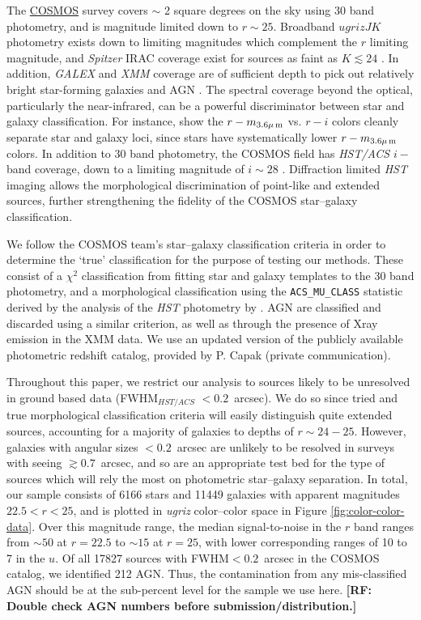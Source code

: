 \documentclass[12pt,preprint]{aastex}
\newcommand\rf[1]{{\bf [RF: #1]}}
\begin{document}
The \href{http://cosmos.astro.caltech.edu/}{COSMOS} survey 
\citep{scoville07a} covers $\sim$ 2 square degrees on
the sky using 30 band photometry, and is magnitude limited down to $r
\sim 25$.  Broadband $ugrizJK$ photometry exists down to limiting
magnitudes which complement the $r$ limiting magnitude, and {\it
  Spitzer} IRAC coverage exist for sources as faint as $K\lesssim24$ 
  \citep{capak07,sanders07,taniguchi07}.
In addition, {\it GALEX} and {\it XMM} coverage are of sufficient
depth to pick out relatively bright star-forming galaxies and AGN 
\citep{hasinger07,zamojski07}.
The spectral coverage beyond the optical, particularly the
near-infrared, can be a powerful discriminator between star and
galaxy classification.  For instance, \citet{ilbert09} show the
$r-m_{\rm 3.6\mu\,m}$ vs. $r-i$ colors cleanly separate star and
galaxy loci, since stars have systematically lower $r-m_{\rm
  3.6\mu\,m}$ colors.  In addition to 30 band photometry, the COSMOS
field has \textit{HST/ACS} $i-$band coverage, down to a limiting
magnitude of $i\sim28$ \citep{koekemoer07,scoville07b}.  Diffraction
limited \textit{HST} imaging allows the morphological discrimination
of point-like and extended sources, further strengthening the fidelity
of the COSMOS star--galaxy classification.

We follow the COSMOS team's star--galaxy classification criteria 
in order to determine the `true' classification for the purpose of 
testing our methods.  These consist of a $\chi^2$ classification 
from fitting star and galaxy templates to the 30 band photometry, 
and a morphological classification using the 
{\tt ACS\_MU\_CLASS} statistic derived by the analysis of the 
\textit{HST} photometry by \citet{scarlata07}.  AGN are classified 
and discarded using a similar criterion, as well as through the presence 
of Xray emission in the {XMM} data.  We use an updated version 
of the publicly available photometric redshift catalog, provided by 
P. Capak (private communication).  

Throughout this paper, we restrict our analysis to sources likely to
be unresolved in ground based data (FWHM$_{HST/ACS}$ $< 0.2$~arcsec).  We
do so since tried and true morphological classification criteria will
easily distinguish quite extended sources, accounting for a majority
of galaxies to depths of $r\sim24-25$.  However, galaxies with angular
sizes $< 0.2$~arcsec are unlikely to be resolved in surveys with seeing
$\gtrsim0.7$~arcsec, and so are an appropriate test bed for the type of sources
which will rely the most on photometric star--galaxy separation.  In
total, our sample consists of 6166 stars and 11449 galaxies with apparent 
magnitudes $22.5<r<25$, and is plotted in {\it ugriz} color--color space in
Figure \ref{fig:color-color-data}.   Over this magnitude range, the median 
signal-to-noise in the $r$ band ranges from $\sim50$ at $r=22.5$ to 
$\sim15$ at $r=25$, with lower corresponding ranges of 10 to 7 in the $u$.  
Of all 17827 sources with FWHM$<0.2$~arcsec in the COSMOS catalog, we 
identified 212 AGN.  Thus, the contamination from any mis-classified AGN 
should be at the sub-percent level for the sample we use here.  \rf{Double check 
AGN numbers before submission/distribution.}
\end{document}
